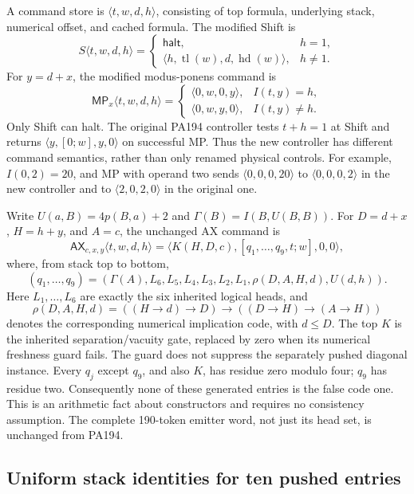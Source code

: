 A command store is $\langle t,w,d,h\rangle$, consisting of top formula,
underlying stack, numerical offset, and cached formula.  The modified
Shift is
\[
 S\langle t,w,d,h\rangle=
 \begin{cases}
  \mathsf{halt},&h=1,\\
  \langle h,\operatorname{tl}(w),d,\operatorname{hd}(w)\rangle,&h\ne1.
 \end{cases}                                                    \tag{C1}
\]
For $y=d+x$, the modified modus-ponens command is
\[
 \mathsf{MP}_x\langle t,w,d,h\rangle=
 \begin{cases}
  \langle0,w,0,y\rangle,&I(t,y)=h,\\
  \langle0,w,y,0\rangle,&I(t,y)\ne h.
 \end{cases}                                                    \tag{C2}
\]
Only Shift can halt.  The original PA194 controller tests $t+h=1$ at
Shift and returns $\langle y,[0;w],y,0\rangle$ on successful MP.
Thus the new controller has different command semantics, rather than
only renamed physical controls.  For example, $I(0,2)=20$, and MP with
operand two sends $\langle0,0,0,20\rangle$ to
$\langle0,0,0,2\rangle$ in the new controller and to
$\langle2,0,2,0\rangle$ in the original one.

Write $U(a,B)=4p(B,a)+2$ and $\Gamma(B)=I(B,U(B,B))$.
For $D=d+x$, $H=h+y$, and $A=c$, the unchanged AX command is
\[
 \mathsf{AX}_{c,x,y}\langle t,w,d,h\rangle
  =\langle K(H,D,c),[q_1,\ldots,q_9,t;w],0,0\rangle,            \tag{C3}
\]
where, from stack top to bottom,
\[
 (q_1,\ldots,q_9)=
 (\Gamma(A),L_6,L_5,L_4,L_3,L_2,L_1,
   \rho(D,A,H,d),U(d,h)).
\]
Here $L_1,\ldots,L_6$ are exactly the six inherited logical heads, and
\[
 \rho(D,A,H,d)=((H\to d)\to D)\to((D\to H)\to(A\to H))
\]
denotes the corresponding numerical implication code, with $d\le D$.
The top $K$ is the inherited separation/vacuity gate, replaced by zero
when its numerical freshness guard fails.  The guard does not suppress
the separately pushed diagonal instance.  Every $q_j$ except $q_9$,
and also $K$, has residue zero modulo four; $q_9$ has residue two.
Consequently none of these generated entries is the false code one.
This is an arithmetic fact about constructors and requires no consistency
assumption.  The complete 190-token emitter word, not just its head set,
is unchanged from PA194.

\subsection{Uniform stack identities for ten pushed entries}

